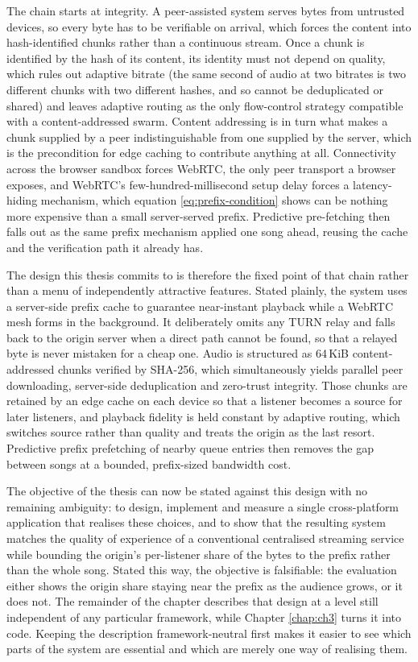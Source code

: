 \par The chain starts at integrity. A peer-assisted system serves bytes from untrusted devices, so every byte has to be verifiable on arrival, which forces the content into hash-identified chunks rather than a continuous stream. Once a chunk is identified by the hash of its content, its identity must not depend on quality, which rules out adaptive bitrate (the same second of audio at two bitrates is two different chunks with two different hashes, and so cannot be deduplicated or shared) and leaves adaptive routing as the only flow-control strategy compatible with a content-addressed swarm. Content addressing is in turn what makes a chunk supplied by a peer indistinguishable from one supplied by the server, which is the precondition for edge caching to contribute anything at all. Connectivity across the browser sandbox forces WebRTC, the only peer transport a browser exposes, and WebRTC's few-hundred-millisecond setup delay forces a latency-hiding mechanism, which equation \eqref{eq:prefix-condition} shows can be nothing more expensive than a small server-served prefix. Predictive pre-fetching then falls out as the same prefix mechanism applied one song ahead, reusing the cache and the verification path it already has.

\par The design this thesis commits to is therefore the fixed point of that chain rather than a menu of independently attractive features. Stated plainly, the system uses a server-side prefix cache to guarantee near-instant playback while a WebRTC mesh forms in the background. It deliberately omits any TURN relay and falls back to the origin server when a direct path cannot be found, so that a relayed byte is never mistaken for a cheap one. Audio is structured as 64\,KiB content-addressed chunks verified by SHA-256, which simultaneously yields parallel peer downloading, server-side deduplication and zero-trust integrity. Those chunks are retained by an edge cache on each device so that a listener becomes a source for later listeners, and playback fidelity is held constant by adaptive routing, which switches source rather than quality and treats the origin as the last resort. Predictive prefix prefetching of nearby queue entries then removes the gap between songs at a bounded, prefix-sized bandwidth cost.

\par The objective of the thesis can now be stated against this design with no remaining ambiguity: to design, implement and measure a single cross-platform application that realises these choices, and to show that the resulting system matches the quality of experience of a conventional centralised streaming service while bounding the origin's per-listener share of the bytes to the prefix rather than the whole song. Stated this way, the objective is falsifiable: the evaluation either shows the origin share staying near the prefix as the audience grows, or it does not. The remainder of the chapter describes that design at a level still independent of any particular framework, while Chapter \ref{chap:ch3} turns it into code. Keeping the description framework-neutral first makes it easier to see which parts of the system are essential and which are merely one way of realising them.

